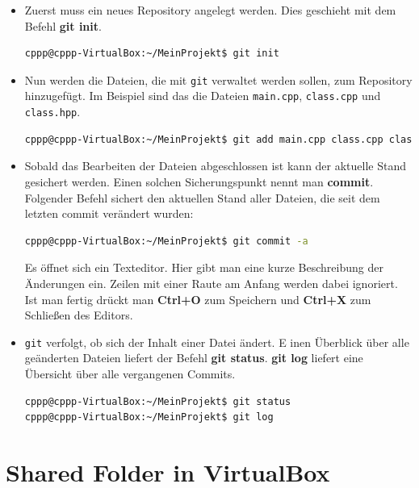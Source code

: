 \begin{itemize}
\item Zuerst muss ein neues Repository angelegt werden. Dies geschieht mit dem Befehl \textbf{git init}.

\begin{lstlisting}[language=bash]
cppp@cppp-VirtualBox:~/MeinProjekt$ git init
\end{lstlisting}

\item Nun werden die Dateien, die mit \texttt{git} verwaltet werden sollen, zum Repository hinzugefügt. 
Im Beispiel sind das die Dateien \texttt{main.cpp}, \texttt{class.cpp} und \texttt{class.hpp}.

\begin{lstlisting}[language=bash]
cppp@cppp-VirtualBox:~/MeinProjekt$ git add main.cpp class.cpp class.hpp
\end{lstlisting}

\item Sobald das Bearbeiten der Dateien abgeschlossen ist kann der aktuelle Stand gesichert werden. 
Einen solchen Sicherungspunkt nennt man \textbf{commit}. 
Folgender Befehl sichert den aktuellen Stand aller Dateien, die seit dem letzten commit verändert wurden:

\begin{lstlisting}[language=bash]
cppp@cppp-VirtualBox:~/MeinProjekt$ git commit -a
\end{lstlisting}

Es öffnet sich ein Texteditor. Hier gibt man eine kurze Beschreibung der Änderungen ein. 
Zeilen mit einer Raute am Anfang werden dabei ignoriert. 
Ist man fertig drückt man \textbf{Ctrl+O} zum Speichern und \textbf{Ctrl+X} zum Schließen des Editors.

\item \texttt{git} verfolgt, ob sich der Inhalt einer Datei ändert. E
inen Überblick über alle geänderten Dateien liefert der Befehl \textbf{git status}. 
\textbf{git log} liefert eine Übersicht über alle vergangenen Commits.

\begin{lstlisting}[language=bash]
cppp@cppp-VirtualBox:~/MeinProjekt$ git status 
cppp@cppp-VirtualBox:~/MeinProjekt$ git log
\end{lstlisting}

\end{itemize}

\section{\ExercisePrefixAdditionalInformation Shared Folder in VirtualBox}

